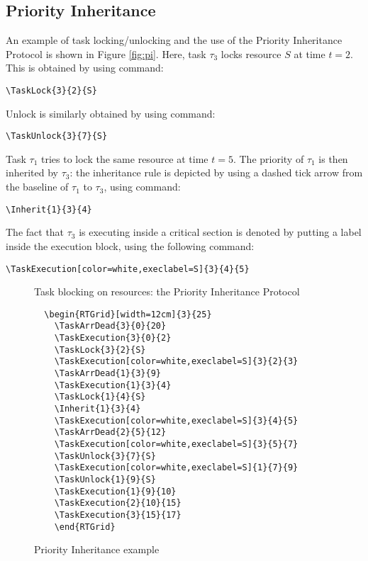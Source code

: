 \documentclass{article}
\begin{document}
\subsection{Priority Inheritance}

An example of task locking/unlocking and the use of the Priority
Inheritance Protocol is shown in Figure \ref{fig:pi}. Here, task
$\tau_3$ locks resource $S$ at time $t=2$. This is obtained by using
command:
\begin{verbatim}
\TaskLock{3}{2}{S}
\end{verbatim}
Unlock is similarly obtained by using command: 
\begin{verbatim}
\TaskUnlock{3}{7}{S}
\end{verbatim}

Task $\tau_1$ tries to lock the same resource at time $t=5$. The
priority of $\tau_1$ is then inherited by $\tau_3$: the inheritance
rule is depicted by using a dashed tick arrow from the baseline of
$\tau_1$ to $\tau_3$, using command:
\begin{verbatim}
\Inherit{1}{3}{4}
\end{verbatim}
The fact that $\tau_3$ is executing inside a critical section is
denoted by putting a label inside the execution block, using the
following command:
\begin{verbatim}
\TaskExecution[color=white,execlabel=S]{3}{4}{5}
\end{verbatim}

\begin{figure}[!htbp]
  \centering
  \begin{RTGrid}[width=12cm]{3}{25}
  \end{RTGrid}
  \caption{Task blocking on resources: the Priority Inheritance Protocol}
  \label{fig:pi}
\begin{verbatim}
  \begin{RTGrid}[width=12cm]{3}{25}
    \TaskArrDead{3}{0}{20}
    \TaskExecution{3}{0}{2}
    \TaskLock{3}{2}{S}
    \TaskExecution[color=white,execlabel=S]{3}{2}{3}
    \TaskArrDead{1}{3}{9}  
    \TaskExecution{1}{3}{4}
    \TaskLock{1}{4}{S}
    \Inherit{1}{3}{4}
    \TaskExecution[color=white,execlabel=S]{3}{4}{5}
    \TaskArrDead{2}{5}{12}
    \TaskExecution[color=white,execlabel=S]{3}{5}{7}
    \TaskUnlock{3}{7}{S}
    \TaskExecution[color=white,execlabel=S]{1}{7}{9}
    \TaskUnlock{1}{9}{S}
    \TaskExecution{1}{9}{10}
    \TaskExecution{2}{10}{15}
    \TaskExecution{3}{15}{17}
    \end{RTGrid}
\end{verbatim}
  \caption{Priority Inheritance example}
  \label{fig:ex4}
\end{figure}
\end{document}
